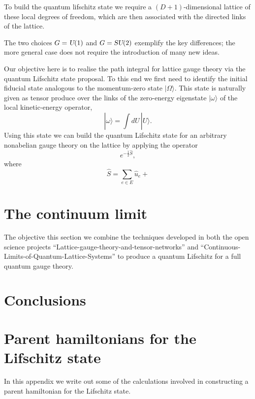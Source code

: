 \documentclass[twocolumn,lengthcheck,superscriptaddress]{revtex4-1}
\def\su2{\textsl{SU}(2)}
\def\uone{\textsl{U}(1)}
\theoremstyle{definition}
\theoremstyle{remark}
\begin{document}
To build the quantum lifschitz state we require a $(D+1)$-dimensional lattice of these local degrees of freedom, which are then associated with the directed links of the lattice.

The two choices $G=\uone$ and $G=\su2$ exemplify the key differences; the more general case does not require the introduction of many new ideas. 

Our objective here is to realise the path integral for lattice gauge theory via the quantum Lifschitz state proposal. To this end we first need to identify the initial fiducial state analogous to the momentum-zero state $|\Omega\rangle$. This state is naturally given as tensor produce over the links of the zero-energy eigenstate $|\omega\rangle$ of the local kinetic-energy operator, 
\begin{equation}
	|\omega\rangle = \int dU \,|U\rangle.
\end{equation}
Using this state we can build the quantum Lifschitz state for an arbitrary nonabelian gauge theory on the lattice by applying the operator 
\begin{equation}
	e^{-\frac12\widehat{S}},
\end{equation}
where
\begin{equation}
	\widehat{S} = \sum_{e\in E} \widehat{u}_e + 
\end{equation}

\section{The continuum limit}
The objective this section we combine the techniques developed in both the open science projects ``Lattice-gauge-theory-and-tensor-networks'' and ``Continuous-Limits-of-Quantum-Lattice-Systems'' to produce a quantum Lifschitz for a full quantum gauge theory.

\section{Conclusions}




\widetext
\appendix
\section{Parent hamiltonians for the Lifschitz state}\label{app:metro}
In this appendix we write out some of the calculations involved in constructing a parent hamiltonian for the Lifschitz state.
\end{document}
